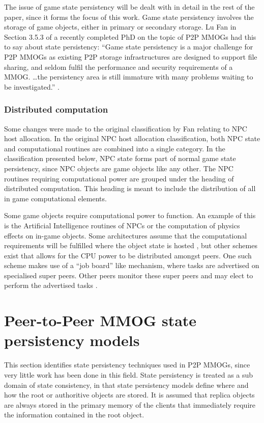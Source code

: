 \documentclass[10pt,a4paper,journal,cspaper,compsoc]{IEEEtran}
\begin{document}
The issue of game state persistency will be dealt with in detail in the rest of the paper, since it forms the focus of this work. Game state
persistency involves the storage of game objects, either in primary or secondary storage. Lu Fan in Section 3.5.3 of a recently completed PhD on the
topic of P2P MMOGs had this to say about state persistency: ``Game state persistency is a major challenge for P2P MMOGs as existing P2P storage
infrastructures are designed to support file sharing, and seldom fulfil the performance and security requirements of a MMOG. \ldots the persistency
area is still immature with many problems waiting to be investigated.'' \cite{Fan_phd}.

\subsubsection{Distributed computation}

Some changes were made to the original classification by Fan relating to NPC host allocation. In the original NPC host allocation classification,
both NPC state and computational routines are combined into a single category. In the classification presented below, NPC state forms part of normal
game state persistency, since NPC objects are game objects like any other. The NPC routines requiring computational power are grouped under the
heading of distributed computation. This heading is meant to include the distribution of all in game computational elements.

Some game objects require computational power to function. An example of this is the Artificial Intelligence routines of \acp{NPC} or the computation
of physics effects on in-game objects. Some architectures assume that the computational requirements will be fulfilled where the object state is
hosted \cite{solipsis}, but other schemes exist that allows for the CPU power to be distributed amongst peers. One such scheme makes use of a ``job
board'' like mechanism, where tasks are advertised on specialised super peers. Other peers monitor these super peers and may elect to perform the
advertised tasks \cite{fan_mediator_paper}.


\section{Peer-to-Peer MMOG state persistency models}
\label{p2p_mmog_state_persistency}

This section identifies state persistency techniques used in P2P MMOGs, since very little work has been done in this field. State persistency is
treated as a sub domain of state consistency, in that state persistency models define where and how the root or authoritive objects are stored. It is
assumed that replica objects are always stored in the primary memory of the clients that immediately require the information contained in the root
object.
\end{document}
